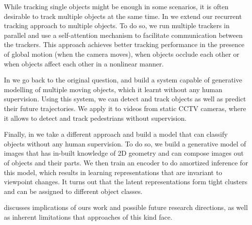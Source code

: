  	While tracking single objects might be enough in some scenarios, it is often desirable to track multiple objects at the same time. In  we extend our recurrent tracking approach to multiple objects. To do so, we run multiple trackers in parallel and use a self-attention mechanism to facilitate communication between the trackers. This approach achieves better tracking performance in the presence of global motion (\!\eg when the camera moves), when objects occlude each other or when objects affect each other in a nonlinear manner.
 	
 	In  we go back to the original question, and build a system capable of generative modelling of multiple moving objects, which it learnt without any human supervision. Using this system, we can detect and track objects as well as predict their future trajectories. We apply it to videos from static CCTV cameras, where it allows to detect and track pedestrians without supervision.
 	
 	Finally, in  we take a different approach and build a model that can classify objects without any human supervision. To do so, we build a generative model of images that has in-built knowledge of 2D geometry and can compose images out of objects and their parts. We then train an encoder to do amortized inference for this model, which results in learning representations that are invariant to viewpoint changes. It turns out that the latent representations form tight clusters and can be assigned to different object classes.
 	
 	 discusses implications of ours work and possible future research directions, as well as inherent limitations that approaches of this kind face. 
 	
 	
 	
 	
	
